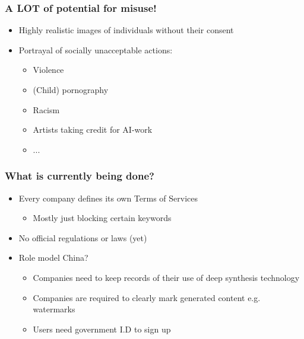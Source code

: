 \documentclass[
	11pt, compress%
]{beamer}
\begin{document}
\begin{frame}
	\frametitle{A LOT of potential for misuse!}
	\begin{itemize}
		\setlength\itemsep{1em}
			\item{Highly realistic images of individuals without their consent}
			\item{Portrayal of socially unacceptable actions:}
			\begin{itemize}
			\item{Violence}
			\item{(Child) pornography}
			\item{Racism}
			\item{Artists taking credit for AI-work}
			\item{...}
			\end{itemize}
	\end{itemize}
\end{frame}

\begin{frame}
	\frametitle{What is currently being done?}
	\begin{itemize}
		\setlength\itemsep{1em}
		\item Every company defines its own Terms of Services
		\begin{itemize}
			\item Mostly just blocking certain keywords
		\end{itemize}
		\item No official regulations or laws (yet)
		\item Role model China?\cite{CACGuidelines}
		\begin{itemize}
			\setlength\itemsep{0,5em}
			\item Companies need to keep records of their use of deep synthesis technology
			\item Companies are required to clearly mark generated content e.g. watermarks
			\item Users need government I.D to sign up
		\end{itemize}
	\end{itemize}
\end{frame}
\end{document}
